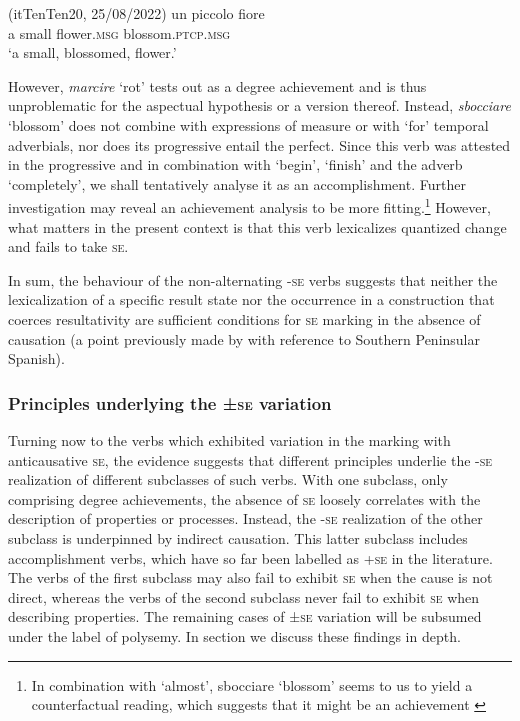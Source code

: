\documentclass[output=paper,colorlinks,citecolor=brown
]{langscibook}
\begin{document}
\hspace*{\fill}(itTenTen20, 25/08/2022)\quad
\ea \label{bentley_example_19}
    \gll un	piccolo	fiore						   \\
    a			small			flower.\textsc{msg}	blossom.\textsc{ptcp}.\textsc{msg}	 \\
    \glt ‘a small, blossomed, flower.’
\z

However, \textit{marcire} ‘rot’ tests out as a degree achievement and is thus unproblematic for the aspectual hypothesis or a version thereof. Instead, \textit{sbocciare} ‘blossom’ does not combine with expressions of measure or with ‘for’ temporal adverbials, nor does its progressive entail the perfect. Since this verb was attested in the progressive and in combination with ‘begin’, ‘finish’ and the adverb ‘completely’, we shall tentatively analyse it as an accomplishment. Further investigation may reveal an achievement analysis to be more fitting.\footnote{In combination with ‘almost’, sbocciare ‘blossom’ seems to us to yield a counterfactual reading, which suggests that it might be an achievement \citep{hay1999scalar}}  However, what matters in the present context is that this verb lexicalizes quantized change and fails to take \textsc{se}. 

In sum, the behaviour of the non-alternating -\textsc{se} verbs suggests that neither the lexicalization of a specific result state nor the occurrence in a construction that coerces resultativity are sufficient conditions for \textsc{se} marking in the absence of causation (a point previously made by \citet{jimenez2017causativity} with reference to Southern Peninsular Spanish).  

\subsubsection{Principles underlying the ±\textsc{se} variation}
\label{bentley_section_3.3.3}
Turning now to the verbs which exhibited variation in the marking with anticausative \textsc{se}, the evidence suggests that different principles underlie the -\textsc{se} realization of different subclasses of such verbs. With one subclass, only comprising degree achievements, the absence of \textsc{se} loosely correlates with the description of properties or processes. Instead, the -\textsc{se} realization of the other subclass is underpinned by indirect causation. This latter subclass includes accomplishment verbs, which have so far been labelled as +\textsc{se} in the literature. The verbs of the first subclass may also fail to exhibit \textsc{se} when the cause is not direct, whereas the verbs of the second subclass never fail to exhibit \textsc{se} when describing properties. The remaining cases of ±\textsc{se} variation will be subsumed under the label of polysemy. In section  we discuss these findings in depth.
\end{document}
